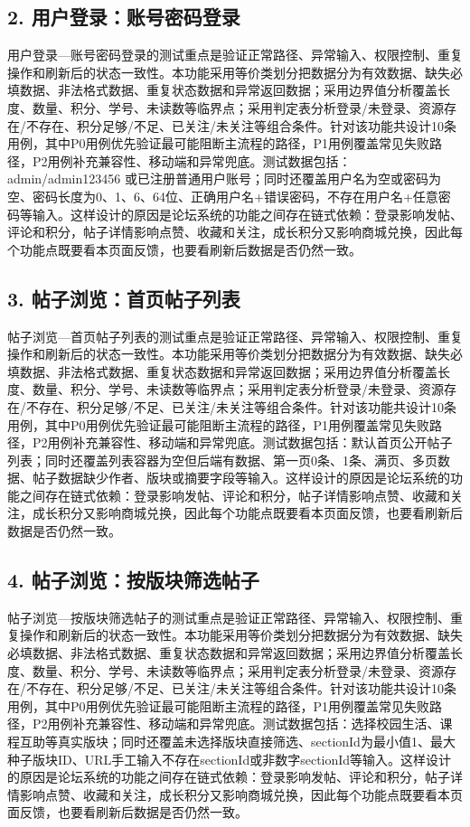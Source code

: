 \documentclass[UTF8,zihao=-4]{ctexart}
\begin{document}
\subsection{2. 用户登录：账号密码登录}
用户登录—账号密码登录的测试重点是验证正常路径、异常输入、权限控制、重复操作和刷新后的状态一致性。本功能采用等价类划分把数据分为有效数据、缺失必填数据、非法格式数据、重复状态数据和异常返回数据；采用边界值分析覆盖长度、数量、积分、学号、未读数等临界点；采用判定表分析登录/未登录、资源存在/不存在、积分足够/不足、已关注/未关注等组合条件。针对该功能共设计10条用例，其中P0用例优先验证最可能阻断主流程的路径，P1用例覆盖常见失败路径，P2用例补充兼容性、移动端和异常兜底。测试数据包括：admin/admin123456 或已注册普通用户账号；同时还覆盖用户名为空或密码为空、密码长度为0、1、6、64位、正确用户名+错误密码，不存在用户名+任意密码等输入。这样设计的原因是论坛系统的功能之间存在链式依赖：登录影响发帖、评论和积分，帖子详情影响点赞、收藏和关注，成长积分又影响商城兑换，因此每个功能点既要看本页面反馈，也要看刷新后数据是否仍然一致。

\subsection{3. 帖子浏览：首页帖子列表}
帖子浏览—首页帖子列表的测试重点是验证正常路径、异常输入、权限控制、重复操作和刷新后的状态一致性。本功能采用等价类划分把数据分为有效数据、缺失必填数据、非法格式数据、重复状态数据和异常返回数据；采用边界值分析覆盖长度、数量、积分、学号、未读数等临界点；采用判定表分析登录/未登录、资源存在/不存在、积分足够/不足、已关注/未关注等组合条件。针对该功能共设计10条用例，其中P0用例优先验证最可能阻断主流程的路径，P1用例覆盖常见失败路径，P2用例补充兼容性、移动端和异常兜底。测试数据包括：默认首页公开帖子列表；同时还覆盖列表容器为空但后端有数据、第一页0条、1条、满页、多页数据、帖子数据缺少作者、版块或摘要字段等输入。这样设计的原因是论坛系统的功能之间存在链式依赖：登录影响发帖、评论和积分，帖子详情影响点赞、收藏和关注，成长积分又影响商城兑换，因此每个功能点既要看本页面反馈，也要看刷新后数据是否仍然一致。

\subsection{4. 帖子浏览：按版块筛选帖子}
帖子浏览—按版块筛选帖子的测试重点是验证正常路径、异常输入、权限控制、重复操作和刷新后的状态一致性。本功能采用等价类划分把数据分为有效数据、缺失必填数据、非法格式数据、重复状态数据和异常返回数据；采用边界值分析覆盖长度、数量、积分、学号、未读数等临界点；采用判定表分析登录/未登录、资源存在/不存在、积分足够/不足、已关注/未关注等组合条件。针对该功能共设计10条用例，其中P0用例优先验证最可能阻断主流程的路径，P1用例覆盖常见失败路径，P2用例补充兼容性、移动端和异常兜底。测试数据包括：选择校园生活、课程互助等真实版块；同时还覆盖未选择版块直接筛选、sectionId为最小值1、最大种子版块ID、URL手工输入不存在sectionId或非数字sectionId等输入。这样设计的原因是论坛系统的功能之间存在链式依赖：登录影响发帖、评论和积分，帖子详情影响点赞、收藏和关注，成长积分又影响商城兑换，因此每个功能点既要看本页面反馈，也要看刷新后数据是否仍然一致。
\end{document}

